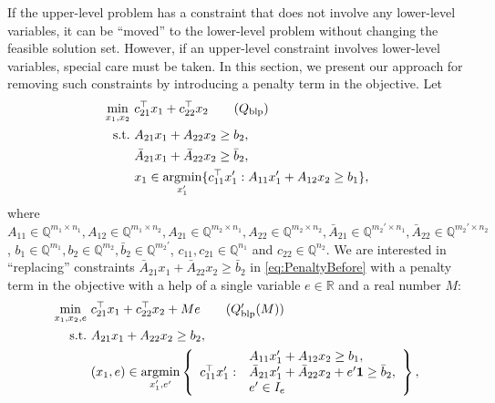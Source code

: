 \documentclass[runningheads,orivec]{llncs}
\newcommand{\MacroColor}[1]{#1}
\DeclareMathOperator*{\Argmin}{\MacroColor{argmin}}
\newcommand{\OneVector}{\mathbf{1}}
\newcommand{\NVariables}{\MacroColor{n}}
\newcommand{\NConstraints}{\MacroColor{m}}
\newcommand{\ReformPen}{\MacroColor{e}}
\begin{document}
\label{Rev:ComplicationByCoupling}
If the upper-level problem has a constraint that does not involve any lower-level variables, it can be ``moved'' to the lower-level problem without changing the feasible solution set. 
However, if an upper-level constraint involves lower-level variables, special care must be taken. 
In this section, we present our approach for removing such constraints by introducing a penalty term in the objective.
Let
\begin{align}
\min_{x_1, x_2} \ &
c_{2 1}^{\top} x_1 + c_{2 2}^{\top} x_2 
\tag{$Q_{\mathrm{blp}}$}
\label{eq:PenaltyBefore}
\\
\text{s.t.} \ &
A_{2 1} x_1 + A_{2 2} x_2 \ge b_2, \notag \\
&
\bar{A}_{2 1} x_1 + \bar{A}_{2 2} x_2 \ge \bar{b}_2, \notag \\
&
x_1 \in \Argmin_{x_1'} \{ c_{1 1}^{\top} x_1' : A_{1 1} x_1' + A_{1 2} x_2 \ge b_1 \}, \notag 
\end{align}
where $A_{1 1} \in \mathbb{Q}^{\NConstraints_1 \times \NVariables_1}, A_{1 2} \in \mathbb{Q}^{\NConstraints_1 \times \NVariables_2}, A_{2 1} \in \mathbb{Q}^{\NConstraints_2 \times \NVariables_1}, A_{2 2} \in \mathbb{Q}^{\NConstraints_2 \times \NVariables_2}, \bar{A}_{2 1} \in \mathbb{Q}^{\NConstraints_2' \times \NVariables_1}, \bar{A}_{2 2} \in \mathbb{Q}^{\NConstraints_2' \times \NVariables_2}$, $b_1 \in \mathbb{Q}^{\NConstraints_1}, b_2 \in \mathbb{Q}^{\NConstraints_2}, \bar{b}_2 \in \mathbb{Q}^{\NConstraints_2'}$, $c_{1 1}, c_{2 1} \in \mathbb{Q}^{\NVariables_1}$ and $c_{2 2} \in \mathbb{Q}^{\NVariables_2}$.
We are interested in ``replacing'' constraints $\bar{A}_{2 1} x_1 + \bar{A}_{2 2} x_2 \ge \bar{b}_2$ in \eqref{eq:PenaltyBefore} with a penalty term in the objective with a help of a single variable $\ReformPen \in \mathbb{R}$ and a real number $M$:
\begin{align}
\min_{x_1, x_2, \ReformPen} \ &
c_{2 1}^{\top} x_1 + c_{2 2}^{\top} x_2 + M \ReformPen
\tag{$Q_{\mathrm{blp}}'(M)$}
\label{eq:PenaltyAfter}
\\
\text{s.t.} \ &
A_{2 1} x_1 + A_{2 2} x_2 \ge b_2, \notag \\
&
(x_1, \ReformPen) \in \Argmin_{x_1', \ReformPen'} 
\left\{ 
\begin{array}{rl}
&
A_{1 1} x_1' + A_{1 2} x_2 \ge b_1, \\
c_{1 1}^{\top} x_1' : 
&
\bar{A}_{2 1} x_1' + \bar{A}_{2 2} x_2 + \ReformPen' \OneVector \ge \bar{b}_2, \\
&
\ReformPen' \in I_{\ReformPen}
\end{array}
\right\}, \notag 
\end{align}
\end{document}

